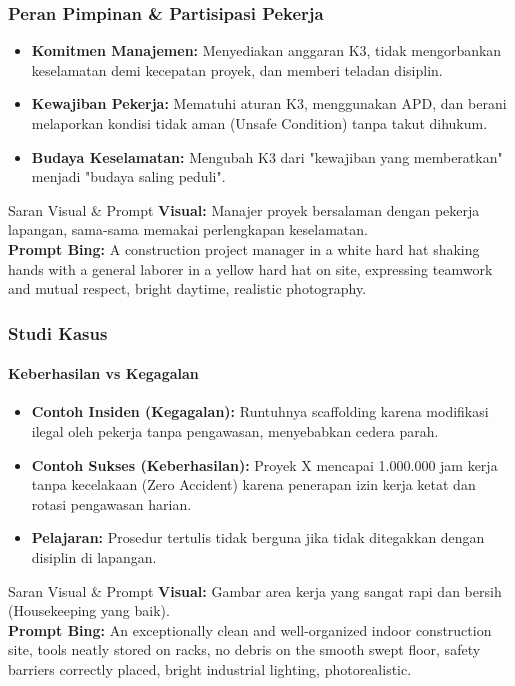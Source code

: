 \documentclass[../main.tex]{subfiles}
\begin{document}
\begin{frame}[mytitle=standard, c, mycolor=digiPH_gray]
	\frametitle{Peran Pimpinan \& Partisipasi Pekerja}

	\begin{itemize}
		\item \textbf{Komitmen Manajemen:} Menyediakan anggaran K3, tidak mengorbankan keselamatan demi kecepatan proyek, dan memberi teladan disiplin.
		\item \textbf{Kewajiban Pekerja:} Mematuhi aturan K3, menggunakan APD, dan berani melaporkan kondisi tidak aman (Unsafe Condition) tanpa takut dihukum.
		\item \textbf{Budaya Keselamatan:} Mengubah K3 dari "kewajiban yang memberatkan" menjadi "budaya saling peduli".
	\end{itemize}

	\vfill
	\begin{block}{Saran Visual \& Prompt}
		\scriptsize
		\textbf{Visual:} Manajer proyek bersalaman dengan pekerja lapangan, sama-sama memakai perlengkapan keselamatan.\\
		\textbf{Prompt Bing:} A construction project manager in a white hard hat shaking hands with a general laborer in a yellow hard hat on site, expressing teamwork and mutual respect, bright daytime, realistic photography.
	\end{block}
\end{frame}

\begin{frame}[mytitle=standard, t]
	\frametitle{Studi Kasus}
	\framesubtitle{Keberhasilan vs Kegagalan}

	\begin{itemize}
		\item \textbf{Contoh Insiden (Kegagalan):} Runtuhnya scaffolding karena modifikasi ilegal oleh pekerja tanpa pengawasan, menyebabkan cedera parah.
		\item \textbf{Contoh Sukses (Keberhasilan):} Proyek X mencapai 1.000.000 jam kerja tanpa kecelakaan (Zero Accident) karena penerapan izin kerja ketat dan rotasi pengawasan harian.
		\item \textbf{Pelajaran:} Prosedur tertulis tidak berguna jika tidak ditegakkan dengan disiplin di lapangan.
	\end{itemize}

	\vfill
	\begin{block}{Saran Visual \& Prompt}
		\scriptsize
		\textbf{Visual:} Gambar area kerja yang sangat rapi dan bersih (Housekeeping yang baik).\\
		\textbf{Prompt Bing:} An exceptionally clean and well-organized indoor construction site, tools neatly stored on racks, no debris on the smooth swept floor, safety barriers correctly placed, bright industrial lighting, photorealistic.
	\end{block}
\end{frame}
\end{document}

